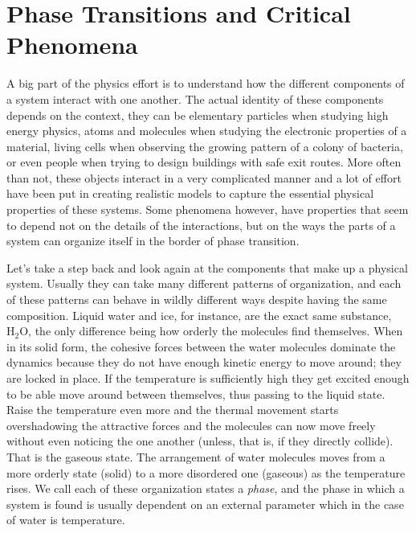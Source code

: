 \chapter{Phase Transitions and Critical Phenomena}
\label{ch2-crit}



A big part of the physics effort is to understand how the different components
of a system interact with one another. The actual identity of these components
depends on the context, they can be elementary particles when studying high
energy physics, atoms and molecules when studying the electronic properties of
a material, living cells when observing the growing pattern of a colony of
bacteria, or even people when trying to design buildings with safe exit routes.
More often than not, these objects interact in a very complicated manner and a
lot of effort have been put in creating realistic models to capture the
essential physical properties of these systems. Some phenomena however, have
properties that seem to depend not on the details of the interactions, but on
the ways the parts of a system can organize itself in the border of phase
transition.

Let's take a step back and look again at the components that make up a physical
system. Usually they can take many different patterns of organization, and each
of these patterns can behave in wildly different ways despite having the same
composition. Liquid water and ice, for instance, are the exact same substance,
$\mbox{H}_2\mbox{O}$, the only difference being how orderly the molecules find
themselves. When in its solid form, the cohesive forces between the water
molecules dominate the dynamics because they do not have enough kinetic energy
to move around; they are locked in place. If the temperature is sufficiently
high they get excited enough to be able move around between themselves, thus
passing to the liquid state. Raise the temperature even more and the thermal
movement starts overshadowing the attractive forces and the molecules can now
move freely without even noticing the one another (unless, that is, if they
directly collide). That is the gaseous state. The arrangement of water
molecules moves from a more orderly state (solid) to a more disordered one
(gaseous) as the temperature rises. We call each of these organization states a
\textit{phase}, and the phase in which a system is found is usually dependent
on an external parameter which in the case of water is temperature.

